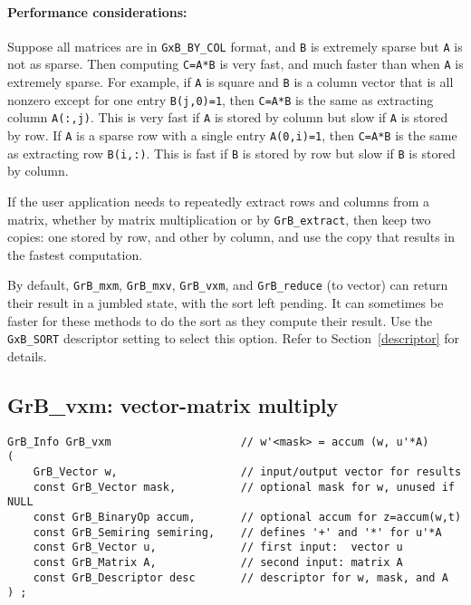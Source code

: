 \documentclass[12pt]{article}
\begin{document}
{\paragraph{\bf Performance considerations:}
Suppose all matrices are in \verb'GxB_BY_COL' format, and \verb'B' is extremely
sparse but \verb'A' is not as sparse.  Then computing \verb'C=A*B' is very
fast, and much faster than when \verb'A' is extremely sparse.  For example, if
\verb'A' is square and \verb'B' is a column vector that is all nonzero except
for one entry \verb'B(j,0)=1', then \verb'C=A*B' is the same as extracting
column \verb'A(:,j)'.  This is very fast if \verb'A' is stored by column but
slow if \verb'A' is stored by row.  If \verb'A' is a sparse row with a single
entry \verb'A(0,i)=1', then \verb'C=A*B' is the same as extracting row
\verb'B(i,:)'.  This is fast if \verb'B' is stored by row but slow if \verb'B'
is stored by column.

If the user application needs to repeatedly extract rows and columns from a
matrix, whether by matrix multiplication or by \verb'GrB_extract', then keep
two copies: one stored by row, and other by column, and use the copy that
results in the fastest computation.

By default, \verb'GrB_mxm', \verb'GrB_mxv', \verb'GrB_vxm', and
\verb'GrB_reduce' (to vector) can return their result in a jumbled state, with
the sort left pending.  It can sometimes be faster for these methods to do the
sort as they compute their result.  Use the \verb'GxB_SORT' descriptor setting
to select this option.  Refer to Section~\ref{descriptor} for details.

\newpage
\subsection{{\sf GrB\_vxm:} vector-matrix multiply} %
\label{vxm}

\begin{mdframed}[userdefinedwidth=6in]
{\footnotesize
\begin{verbatim}
GrB_Info GrB_vxm                    // w'<mask> = accum (w, u'*A)
(
    GrB_Vector w,                   // input/output vector for results
    const GrB_Vector mask,          // optional mask for w, unused if NULL
    const GrB_BinaryOp accum,       // optional accum for z=accum(w,t)
    const GrB_Semiring semiring,    // defines '+' and '*' for u'*A
    const GrB_Vector u,             // first input:  vector u
    const GrB_Matrix A,             // second input: matrix A
    const GrB_Descriptor desc       // descriptor for w, mask, and A
) ;
\end{verbatim} } \end{mdframed}

}
\end{document}

